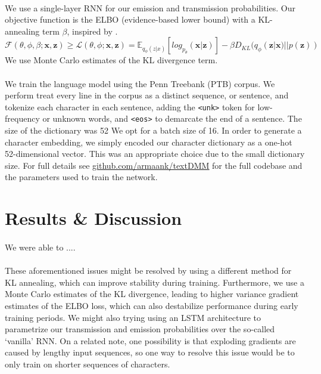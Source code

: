 \documentclass[justified,nobib]{tufte-handout}
\begin{document}
\begin{fullwidth}
\paragraph{}
 We use a single-layer RNN for our emission and transmission probabilities. Our objective function is the ELBO (evidence-based lower bound) with a KL-annealing term $\beta$, inspired by \cite{bvae}.
 \begin{equation}
\mathcal{F}(\theta,\phi,\beta;\bm{x},\bm{z}) \geq \mathcal{L}(\theta,\phi;\bm{x},\bm{z}) = \mathbb{E}_{q_{\phi}(z|x)}[log_{p_{\theta}}(\bm{x}|\bm{z})]-\beta D_{KL}(q_{\phi}(\bm{z}|\bm{x})||p(\bm{z}))
\end{equation} 
We use Monte Carlo estimates of the KL divergence term. 
\paragraph{} We train the language model using the Penn Treebank (PTB) corpus. We perform treat every line in the corpus as a distinct sequence, or sentence, and tokenize each character in each sentence, adding the \texttt{<unk>} token for low-frequency or unknown words, and \texttt{<eos>} to demarcate the end of a sentence. The size of the dictionary was 52 We opt for a batch size of 16. In order to generate a character embedding, we simply encoded our character dictionary as a one-hot 52-dimensional vector. This was an appropriate choice due to the small dictionary size. For full details see \underline{\href{https://github.com/armaank/textDMM}{github.com/armaank/textDMM}} for the full codebase and the parameters used to train the network. 

\section{Results \& Discussion}

\paragraph{} We were able to ....

\paragraph{} These aforementioned issues might be resolved by using a different method for KL annealing, which can improve stability during training. Furthermore, we use a Monte Carlo estimates of the KL divergence, leading to higher variance gradient estimates of the ELBO loss, which can also destabilize performance during early training periods. We might also trying using an LSTM architecture to parametrize our transmission and emission probabilities over the so-called `vanilla' RNN. On a related note, one possibility is that exploding gradients are caused by lengthy input sequences, so one way to resolve this issue would be to only train on shorter sequences of characters. 


\end{fullwidth}
\end{document}
